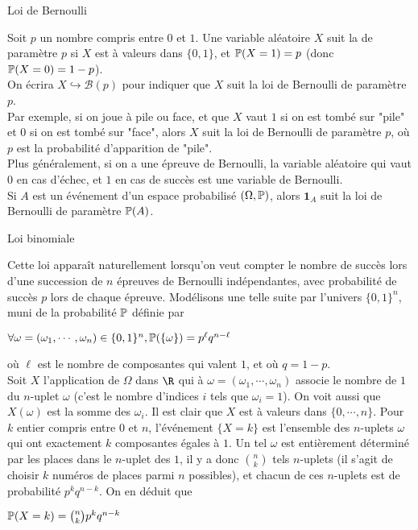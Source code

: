 \documentclass[12pt,a4paper]{report}
\begin{document}
\begin{exemple}{Loi de Bernoulli}{}

Soit $p$ un nombre compris entre $0$ et $1$. Une variable aléatoire $X$ suit la  de paramètre $p$ si $X$ est à valeurs dans $\{0,1\}$, et $\mathbb{P}(X=1) = p$  (donc $\mathbb{P}(X=0) = 1-p$). \\
On écrira $X \hookrightarrow \mathcal{B}(p)$ pour indiquer que $X$ suit la loi de Bernoulli de paramètre $p$. \\

Par exemple, si on joue à pile ou face, et que $X$ vaut $1$ si on est tombé sur "pile" et $0$ si on est tombé sur "face", alors $X$ suit la loi de Bernoulli de paramètre $p$, où $p$ est la probabilité d'apparition de "pile". \\

Plus généralement, si on a une épreuve de Bernoulli, la variable aléatoire qui vaut $0$ en cas d'échec, et $1$ en cas de succès est une variable de Bernoulli. \\

Si $A$ est un événement d'un espace probabilisé $(\Omega, \mathbb{P})$, alors $\textbf{1}_A$ suit la loi de Bernoulli de paramètre $\mathbb{P}(A)$.

\end{exemple}

\begin{exemple}{Loi binomiale}{}

Cette loi apparaît naturellement lorsqu'on veut compter le nombre de succès lors d'une succession de $n$ épreuves de Bernoulli indépendantes, avec probabilité de succès $p$ lors de chaque épreuve. Modélisons une telle suite par l'univers $\{0,1\}^n$, muni de la probabilité $\mathbb{P}$ définie par
\begin{center}
$\forall \omega = (\omega_1,\cdots,\omega_n) \in \{0,1\}^n, \mathbb{P}(\{\omega\}) = p^\ell q^{n-\ell}$
\end{center}
où $\ell$ est le nombre de composantes qui valent $1$, et où $q=1-p$. \\

Soit $X$ l'application de $\Omega$ dans $\R$ qui à $\omega = (\omega_1,\cdots,\omega_n)$ associe le nombre de $1$ du $n$-uplet $\omega$ (c'est le nombre d'indices $i$ tels que $\omega_i = 1$). On voit aussi que $X(\omega)$ est la somme des $\omega_i$. Il est clair que $X$ est à valeurs dans $\{0,\cdots,n\}$. Pour $k$ entier compris entre $0$ et $n$, l'événement $\{X = k\}$ est l'ensemble des $n$-uplets $\omega$ qui ont exactement $k$ composantes égales à $1$. Un tel $\omega$ est entièrement déterminé par les places dans le $n$-uplet des $1$, il y a donc $\binom{n}{k}$ tels $n$-uplets (il s'agit de choisir $k$ numéros de places parmi $n$ possibles), et chacun de ces $n$-uplets est de probabilité $p^kq^{n-k}$. On en déduit que 
\begin{center}
$\mathbb{P}(X=k) = \binom{n}{k} p^kq^{n-k}$
\end{center}
\end{exemple}
\end{document}

